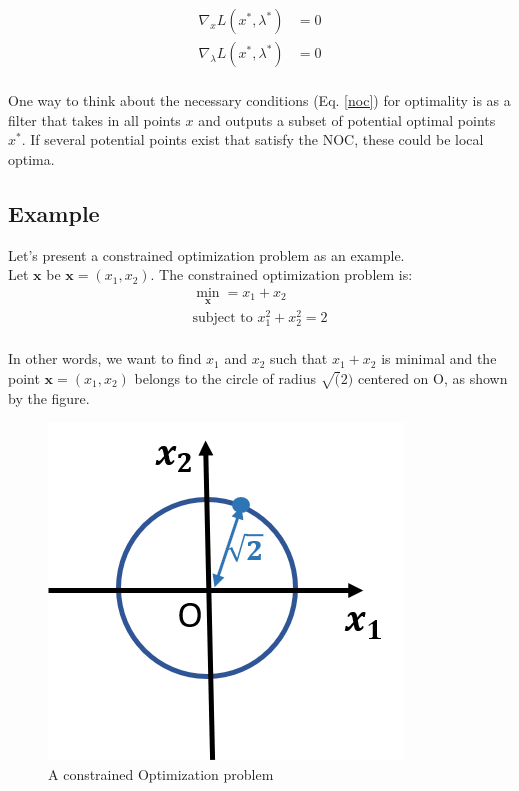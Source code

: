 \documentclass[twoside]{article}
\begin{document}
\begin{equation} \label{noc}
\begin{split}
\nabla_x L(x^*,\lambda^*) &= 0 \\
\nabla_\lambda L(x^*,\lambda^*) &= 0 \\
\end{split}
\end{equation}

One way to think about the necessary conditions (Eq. \ref{noc}) for optimality is as a filter that takes in all points $x$ and outputs a subset of potential optimal points $x^*$. If several potential points exist that satisfy the NOC, these could be local optima.

\subsection{Example}

Let's present a constrained optimization problem as an example. \\
Let $\mathbf{x}$ be $\mathbf{x} = (x_1, x_2)$. The constrained optimization problem is: 
\begin{equation}\label{ex_optim}
\begin{array}{c}
\min_{\mathbf{x}} = x_1 + x_2 \\
\text{subject to } x_1^2 + x_2^2 = 2 \\
\end{array}
\end{equation}


In other words, we want to find $x_1$ and $x_2$ such that $x_1 + x_2$ is minimal and the point $\mathbf{x} = (x_1, x_2)$ belongs to the circle of radius $\sqrt(2)$ centered on O, as shown by the figure. 

\begin{figure}[ht]
    \centering
    \includegraphics[scale = 0.7]{Constrainted_Optim1.png}
    \caption{A constrained Optimization problem}
    \label{fig:constr_optim}
\end{figure}
\end{document}
